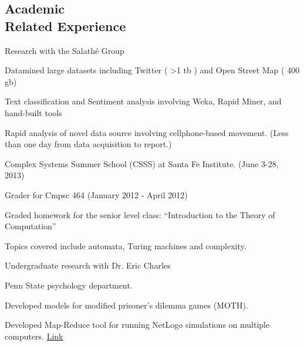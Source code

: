 \documentclass[margin,line]{res}
\newcommand{\linkToUrl}[1]{{\color{blue}\underline{\href{#1}{Link}}}}
\newenvironment{list1}{
  \begin{list}{\ding{113}}{%
      \setlength{\itemsep}{0in}
      \setlength{\parsep}{0in} \setlength{\parskip}{0in}
      \setlength{\topsep}{0in} \setlength{\partopsep}{0in} 
      \setlength{\leftmargin}{0.17in}}}{\end{list}}
\begin{document}
\begin{resume}
\section{\sc Academic \\Related Experience}
Research with the Salath\'e Group%
\begin{list1}
\item[] Datamined large datasets including Twitter  ( \textgreater 1 tb ) and Open Street Map ( 400 gb)
\item[] Text classification and Sentiment analysis involving Weka, Rapid Miner, and hand-built tools
\item[] Rapid analysis of novel data source involving cellphone-based movement. (Less than one day from data acquisition to report.)
\end{list1}
Complex Systems Summer School (CSSS) at Santa Fe Institute. (June 3-28, 2013)

Grader for Cmpsc 464 (January 2012 - April 2012)
\begin{list1}
\item[] Graded homework for the senior level class: ``Introduction to the Theory of Computation''
\item[] Topics covered include automata, Turing machines and complexity.
\end{list1}
Undergraduate research with Dr. Eric Charles%
\begin{list1}
\item[] Penn State psychology department.
\item[] Developed models for modified prisoner's dilemma games (MOTH).
\item[] Developed Map-Reduce tool for running NetLogo simulations on multiple computers. \linkToUrl{http://bit.ly/12UQ4cq}
\end{list1}





\end{resume}
\end{document}
